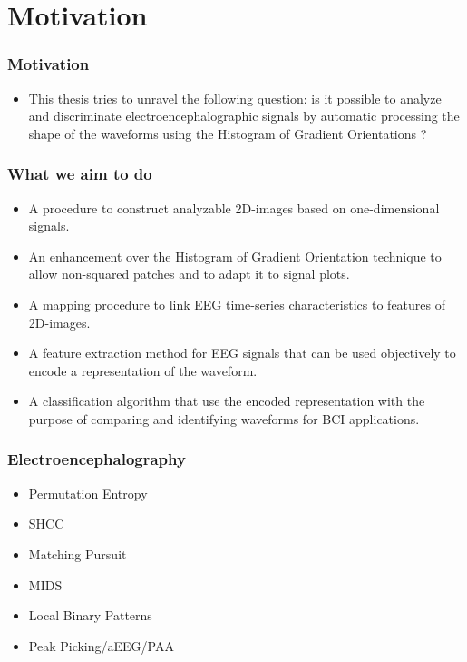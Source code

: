 \documentclass[aspectratio=169]{beamer}
\begin{document}
    \section{Motivation}
    \begin{frame}
        \frametitle{Motivation}
        \begin{center}
            \begin{itemize}
                \item This thesis tries to unravel the following question: is it possible to analyze and discriminate electroencephalographic signals by automatic processing the shape of the waveforms using the Histogram of Gradient Orientations ?
            \end{itemize}
        \end{center}
    \end{frame}
    \begin{frame}
        \frametitle{What we aim to do}
        \begin{center}
            \begin{itemize}
\begin{itemize}
\item A procedure to construct analyzable 2D-images based on one-dimensional signals.
\item An enhancement over the Histogram of Gradient Orientation technique to allow non-squared patches and to adapt it to signal plots.
\item A mapping procedure to link EEG time-series characteristics to features of 2D-images.
\item A feature extraction method for EEG signals that can be used objectively to encode a representation of the waveform.
\item A classification algorithm that use the encoded representation with the purpose of comparing and identifying waveforms for BCI applications.
\end{itemize}
            \end{itemize}
        \end{center}
    \end{frame}
    
    
\begin{frame}
\frametitle{Electroencephalography}
\begin{center}
\begin{itemize}
 \item<1-> Permutation Entropy
 \item<2-> SHCC
 \item<3-> Matching Pursuit
 \item<4-> MIDS
 \item<5-> Local Binary Patterns
 \item<6-> Peak Picking/aEEG/PAA
\end{itemize}
\end{center}
\end{frame}
\end{document}
